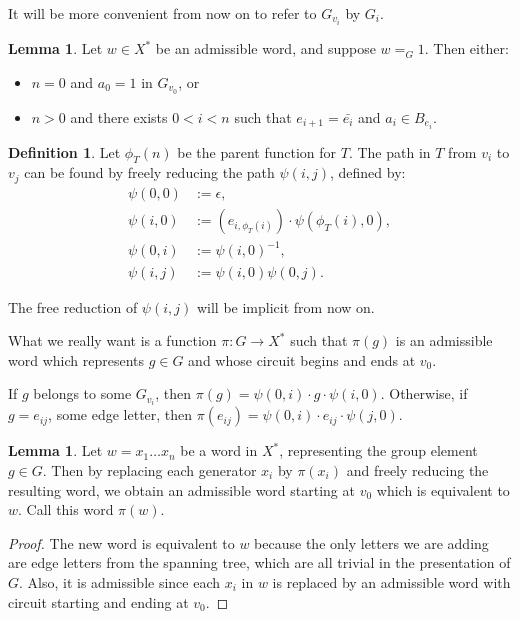 \documentclass[a4paper]{article}
\theoremstyle{plain}
\theoremstyle{definition}
\newtheorem{lemma}[theorem]{Lemma}
\newtheorem{definition}[theorem]{Definition}
\begin{document}
It will be more convenient from now on to refer to $G_{v_i}$ by $G_i$.

\begin{lemma}
	\label{trivialnormalform} \cite[Proposition 2.4]{Kapovich_2005}
Let $w \in X^{\ast}$ be an admissible word, and suppose $w =_G 1$. Then either:
\begin{itemize}
	\item $n=0$ and $a_0=1$ in $G_{v_0}$, or
	\item $n > 0$ and there exists $0<i<n$ such that $e_{i+1}=\bar{e_i}$ and $a_i \in B_{e_i}$.
\end{itemize}
\end{lemma}

\begin{definition}
Let $\phi_T(n)$ be the parent function for $T$. The path in $T$ from $v_i$ to $v_j$ can be found by freely reducing the path $\psi(i,j)$, defined by:
\begin{equation}\begin{split}
\psi(0,0) &:= \epsilon, \\
\psi(i,0) &:= (e_{i,\phi_T(i)}) \cdot \psi(\phi_T(i),0), \\
\psi(0,i) &:= \psi(i,0)^{-1}, \\
\psi(i,j) &:= \psi(i,0) \psi(0,j).
\end{split}\end{equation}

The free reduction of $\psi(i,j)$ will be implicit from now on.

What we really want is a function $\pi:G \rightarrow X^{\ast}$ such that $\pi(g)$ is an admissible word which represents $g \in G$ and whose circuit begins and ends at $v_0$.

If $g$ belongs to some $G_{v_i}$, then $\pi(g) = \psi(0,i) \cdot g \cdot \psi(i,0)$. Otherwise, if $g = e_{ij}$, some edge letter, then $\pi(e_{ij}) = \psi(0,i) \cdot e_{ij} \cdot \psi(j,0)$.
\end{definition}

\begin{lemma}
	Let $w = x_1 \dots x_n$ be a word in $X^{\ast}$, representing the group element $g \in G$. Then by replacing each generator $x_i$ by $\pi(x_i)$ and freely reducing the resulting word, we obtain an admissible word starting at $v_0$ which is equivalent to $w$. Call this word $\pi(w)$.
\end{lemma}

\begin{proof}
The new word is equivalent to $w$ because the only letters we are adding are edge letters from the spanning tree, which are all trivial in the presentation of $G$. Also, it is admissible since each $x_i$ in $w$ is replaced by an admissible word with circuit starting and ending at $v_0$.
\end{proof}
\end{document}
